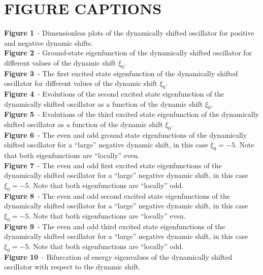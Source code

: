 \documentclass[12pt]{article}
\begin{document}
\section*{FIGURE CAPTIONS}
\vspace{-0.25cm}
\noindent\textbf{Figure 1}~- Dimensionless plots of the dynamically shifted oscillator for positive and negative dynamic shifts.\\
\textbf{Figure 2}~- Ground-state eigenfunction of the dynamically shifted oscillator for different values of the dynamic shift $\xi_0$.\\ 
\textbf{Figure 3}~- The first excited state eigenfunction of the dynamically shifted oscillator for different values of the dynamic shift $\xi_0$.\\
\textbf{Figure 4}~- Evolutions of the second excited state eigenfunction of the dynamically shifted oscillator as a function of the dynamic shift $\xi_0$.\\
\textbf{Figure 5}~- Evolutions of the third excited state eigenfunction of the dynamically shifted oscillator as a function of the dynamic shift $\xi_0$.\\
\textbf{Figure 6}~- The even and odd ground state eigenfunctions of the dynamically shifted oscillator for a ``large'' negative dynamic shift, in this case $\xi_0=-5$. Note that both eigenfunctions are ``locally'' even.\\
\textbf{Figure 7}~- The even and odd first excited state eigenfunctions of the dynamically shifted oscillator for a ``large'' negative dynamic shift, in this case $\xi_0=-5$. Note that both eigenfunctions are ``locally'' odd.\\
\textbf{Figure 8}~- The even and odd second excited state eigenfunctions of the dynamically shifted oscillator for a ``large'' negative dynamic shift, in this case $\xi_0=-5$. Note that both eigenfunctions are ``locally'' even.\\
\textbf{Figure 9}~- The even and odd third excited state eigenfunctions of the dynamically shifted oscillator for a ``large'' negative dynamic shift, in this case $\xi_0=-5$. Note that both eigenfunctions are ``locally'' odd.\\
\textbf{Figure 10}~- Bifurcation of energy eigenvalues of the dynamically shifted oscillator with respect to the dynamic shift.
\end{document}
